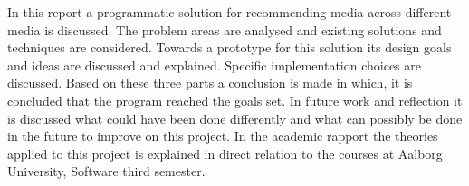 In this report a programmatic solution for recommending media across different media is discussed. The problem areas are analysed and existing solutions and techniques are considered. Towards a prototype for this solution its design goals and ideas are discussed and explained. Specific implementation choices are discussed. Based on these three parts a conclusion is made in which, it is concluded that the program reached the goals set. 
In future work and reflection it is discussed what could have been done differently and what can possibly be done in the future to improve on this project.
In the academic rapport the theories applied to this project is explained in direct relation to the courses at Aalborg University, Software third semester.